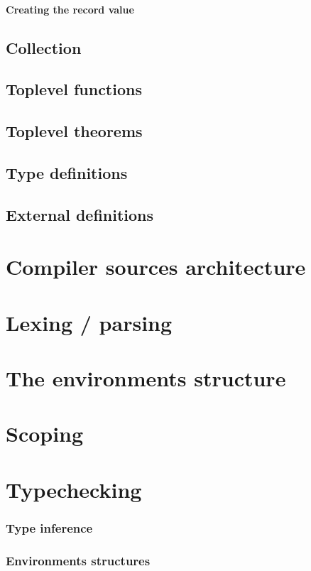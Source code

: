 \documentclass{book}
\begin{document}
\subsubsection{Creating the record value}
\section{Collection}
\section{Toplevel functions}
\section{Toplevel theorems}
\section{Type definitions}
\section{External definitions}

\chapter{Compiler sources architecture}


\chapter{Lexing / parsing}


\chapter{The environments structure}


\chapter{Scoping}


\chapter{Typechecking}
\subsection{Type inference}
\subsection{Environments structures}
\end{document}

